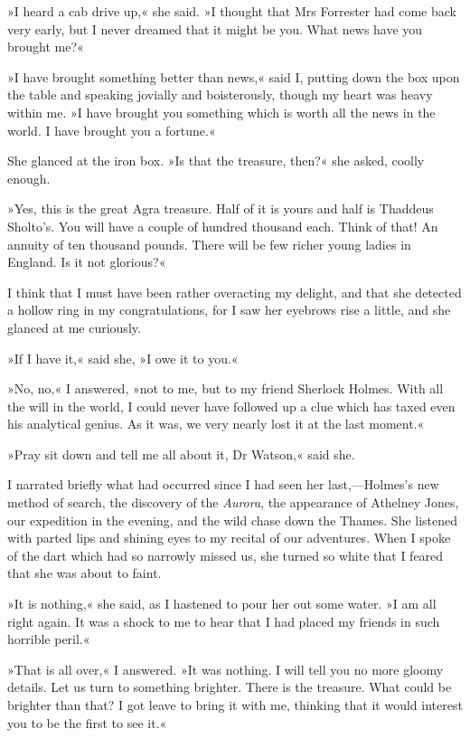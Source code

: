 »I heard a cab drive up,« she said. »I thought that Mrs Forrester had come back very early, but I never dreamed that it might be you. What news have you brought me?«

»I have brought something better than news,« said I, putting down the box upon the table and speaking jovially and boisterously, though my heart was heavy within me. »I have brought you something which is worth all the news in the world. I have brought you a fortune.«

She glanced at the iron box. »Is that the treasure, then?« she asked, coolly enough.

»Yes, this is the great Agra treasure. Half of it is yours and half is Thaddeus Sholto's. You will have a couple of hundred thousand each. Think of that! An annuity of ten thousand pounds. There will be few richer young ladies in England. Is it not glorious?«

I think that I must have been rather overacting my delight, and that she detected a hollow ring in my congratulations, for I saw her eyebrows rise a little, and she glanced at me curiously.

»If I have it,« said she, »I owe it to you.«

»No, no,« I answered, »not to me, but to my friend Sherlock Holmes. With all the will in the world, I could never have followed up a clue which has taxed even his analytical genius. As it was, we very nearly lost it at the last moment.«

»Pray sit down and tell me all about it, Dr Watson,« said she.

I narrated briefly what had occurred since I had seen her last,—Holmes's new method of search, the discovery of the \textit{Aurora}, the appearance of Athelney Jones, our expedition in the evening, and the wild chase down the Thames. She listened with parted lips and shining eyes to my recital of our adventures. When I spoke of the dart which had so narrowly missed us, she turned so white that I feared that she was about to faint.

»It is nothing,« she said, as I hastened to pour her out some water. »I am all right again. It was a shock to me to hear that I had placed my friends in such horrible peril.«

»That is all over,« I answered. »It was nothing. I will tell you no more gloomy details. Let us turn to something brighter. There is the treasure. What could be brighter than that? I got leave to bring it with me, thinking that it would interest you to be the first to see it.«

